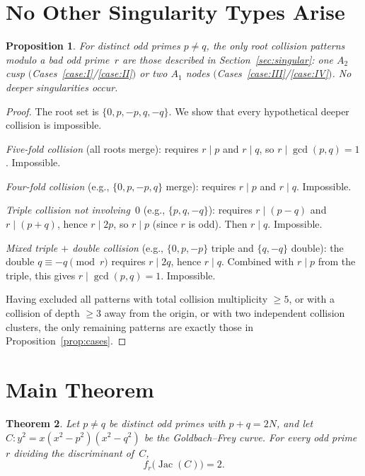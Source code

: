 \documentclass[11pt,a4paper]{article}
\newcommand{\Jac}{\operatorname{Jac}}
\newtheorem{theorem}{Theorem}[section]
\newtheorem{proposition}[theorem]{Proposition}
\theoremstyle{definition}
\theoremstyle{remark}
\begin{document}
\section{No Other Singularity Types Arise}\label{sec:exhaust}

\begin{proposition}\label{prop:no-deeper}
  For distinct odd primes $p \ne q$, the only root collision
  patterns modulo a bad odd prime~$r$ are those described in
  Section~\ref{sec:singular}: one $A_2$ cusp
  $($Cases~\ref{case:I}/\ref{case:II}$)$ or two $A_1$ nodes
  $($Cases~\ref{case:III}/\ref{case:IV}$)$.
  No deeper singularities occur.
\end{proposition}

\begin{proof}
  The root set is $\{0, p, -p, q, -q\}$.  We show that every
  hypothetical deeper collision is impossible.

  \emph{Five-fold collision} (all roots merge):
  requires $r \mid p$ and $r \mid q$, so
  $r \mid \gcd(p, q) = 1$.  Impossible.

  \emph{Four-fold collision} (e.g., $\{0, p, -p, q\}$ merge):
  requires $r \mid p$ and $r \mid q$.  Impossible.

  \emph{Triple collision not involving~$0$}
  (e.g., $\{p, q, -q\}$):
  requires $r \mid (p - q)$ and $r \mid (p + q)$, hence
  $r \mid 2p$, so $r \mid p$ (since $r$ is odd).
  Then $r \mid q$. Impossible.

  \emph{Mixed triple $+$ double collision}
  (e.g., $\{0, p, -p\}$ triple and $\{q, -q\}$ double):
  the double $q \equiv -q \pmod{r}$ requires $r \mid 2q$,
  hence $r \mid q$.  Combined with $r \mid p$ from the triple,
  this gives $r \mid \gcd(p, q) = 1$.  Impossible.

  Having excluded all patterns with total collision
  multiplicity $\ge 5$, or with a collision of depth
  $\ge 3$ away from the origin, or with two independent
  collision clusters, the only remaining patterns are
  exactly those in Proposition~\ref{prop:cases}.
\end{proof}


\section{Main Theorem}\label{sec:main}

\begin{theorem}\label{thm:main}
  Let $p \ne q$ be distinct odd primes with $p + q = 2N$, and let
  $C\colon y^2 = x(x^2 - p^2)(x^2 - q^2)$ be the Goldbach--Frey
  curve.  For every odd prime $r$ dividing the discriminant of~$C$,
  \[
    f_r\bigl(\Jac(C)\bigr) = 2.
  \]
\end{theorem}
\end{document}
